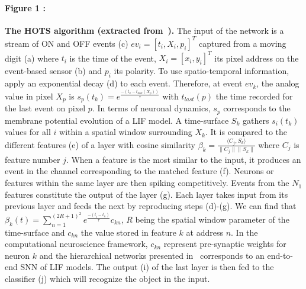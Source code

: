 \documentclass[12pt]{article}
\newcommand{\citep}[1]{\parencite{#1}}
\begin{document}
\paragraph*{Figure 1 : }
\textbf{The HOTS algorithm (extracted from~\citep{Lagorce17}).}
The input of the network is a stream of ON and OFF events (c) $ev_i = [t_i,X_i,p_i]^T$ captured from a moving digit (a) where $t_i$ is the time of the event, $X_i=[x_i,y_i]^T$ its pixel address on the event-based sensor (b) and $p_i$ its polarity. To use spatio-temporal information,~\citep{Lagorce17} apply an exponential decay (d) to each event. Therefore, at event $ev_k$, the analog value in pixel $X_p$ is $s_p(t_k) = e^\frac{-(t_k-t_{last}(X_p))}{\tau}$ with $t_{last}(p)$ the time recorded for the last event on pixel $p$. In terms of neuronal dynamics, $s_p$ corresponds to the membrane potential evolution of a LIF model. A time-surface $S_k$ gathers $s_i(t_k)$ values for all $i$ within a spatial window surrounding $X_k$. It is compared to the different features (e) of a layer with cosine similarity $ \beta_k = \frac{\langle C_j,S_k\rangle}{\|C_j\|\|S_k\|}$ where $C_j$ is feature number $j$. 
When a feature is the most similar to the input, it produces an event in the channel corresponding to the matched feature (f). Neurons or features within the same layer are then spiking competitively. Events from the $N_1$ features constitute the output of the layer (g). Each layer takes input from its previous layer and feeds the next by reproducing steps (d)-(g). We can find that $ \beta_k(t) =  \sum_{n=1}^{(2R+1)^2}e^\frac{-(t_i-t_n)}{\tau}c_{kn}$, $R$ being the spatial window parameter of the time-surface and $c_{kn}$ the value stored in feature $k$ at address $n$. In the computational neuroscience framework, $c_{kn}$ represent pre-synaptic weights for neuron $k$ and the hierarchical networks presented in~\citep{Lagorce17} corresponds to an end-to-end SNN of LIF models. The output (i) of the last layer is then fed to the classifier (j) which will recognize the object in the input.
\end{document}
